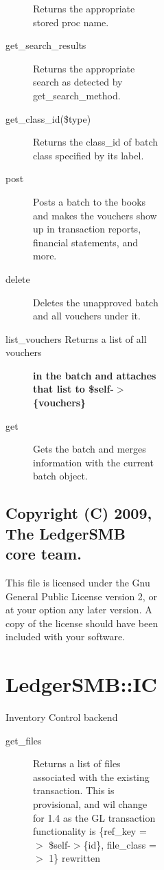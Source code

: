 \begin{description}
\begin{description}
\begin{description}
\begin{description}
\begin{description}
\begin{description}
\begin{description}
\begin{description}
Returns the appropriate stored proc name.


\item[{get\_search\_results}] \mbox{}

Returns the appropriate search as detected by get\_search\_method.


\item[{get\_class\_id(\$type)}] \mbox{}

Returns the class\_id of batch class specified by its label.


\item[{post}] \mbox{}

Posts a batch to the books and makes the vouchers show up in transaction 
reports, financial statements, and more.


\item[{delete}] \mbox{}

Deletes the unapproved batch and all vouchers under it.


\item[{list\_vouchers Returns a list of all vouchers}] \textbf{in the batch and attaches that list to \$self-$>$\{vouchers\}}
\item[{get}] \mbox{}

Gets the batch and merges information with the current batch object.

\end{description}
\subsection*{Copyright (C) 2009, The LedgerSMB core team.\label{LedgerSMB::Batch_Copyright_C_2009_The_LedgerSMB_core_team_}}


This file is licensed under the Gnu General Public License version 2, or at your
option any later version.  A copy of the license should have been included with
your software.

\section{LedgerSMB::IC\label{LedgerSMB::IC}}


Inventory Control backend

\begin{description}

\item[{get\_files}] \mbox{}

Returns a list of files associated with the existing transaction.  This is 
provisional, and wil change for 1.4 as the GL transaction functionality is 
                  \{ref\_key =$>$ \$self-$>$\{id\}, file\_class =$>$ 1\}
rewritten


\end{description}
\end{description}
\end{description}
\end{description}
\end{description}
\end{description}
\end{description}
\end{description}
